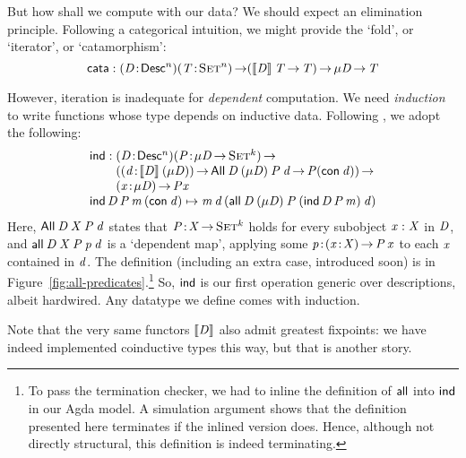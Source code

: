 But how shall we compute with our data?  We should expect an
elimination principle. Following a categorical intuition, we might
provide the `fold', or `iterator', or `catamorphism':
%
\[
\F{cata} : \PITEL{\V{D}}{\Desc^n}
           \PI{\V{T}}{\Set^n}
           (\descop{\V{D}}{\V{T}} \To \V{T}) \To 
           \Mu{\V{D}} \To \V{T} 
\]

\newcommand{\SYMBind}{\F{ind}}

However, iteration is inadequate for \emph{dependent} computation.
We need \emph{induction} to write functions whose type depends on inductive
data. Following \citet{benke:universe-generic-prog}, we adopt the following:
%
\[\stk{
\F{ind} : \stk{ \PITEL{\V{D}}{\Desc^n}
                \PI{\V{P}}{\Mu{\V{D}} \To \Set^k}         \\
               (\PI{\V{d}}{\descop{\V{D}}{(\Mu{\V{D}})}}       
                \All{\V{D}}{(\Mu{\V{D}})}{\V{P}}{\V{d}} \To \V{P} (\Con{\V{d}})) \To \\
               \PI{\V{x}}{\Mu{\V{D}}} \V{P} \V{x} 
} \\
\F{ind}\, \V{D}\, \V{P}\, \V{m}\, (\Con{\V{d}}) \mapsto 
    \V{m}\, \V{d}\, (\all{\V{D}}{(\Mu{\V{D}})}{\V{P}}
                           {(\F{ind}\, \V{D}\, \V{P}\, \V{m})}
                           {\V{d}})
}\]
%
Here, $\All{\V{D}}{\V{X}}{\V{P}}{\V{d}}$ states that
$\Bhab{\V{P}}{\V{X} \To \Set^k}$ holds for every subobject $\V{x}:\V{X}$
in \(\V{D}\), and \(\all{\V{D}}{\V{X}}{\V{P}}{\V{p}}{\V{d}}\) is a
`dependent map', applying some
\(\Bhab{\V{p}}{\PIS{\Bhab{\x}{\V{X}}}\V{P}\,\V{x}}\) to each \(\x\)
contained in \(\V{d}\). The definition (including an extra case,
introduced soon) is in
Figure~\ref{fig:all-predicates}.\footnote{To pass the termination
  checker, we had to inline the definition of $\SYMBall$ into
  $\SYMBind$ in our Agda model. A simulation argument shows that the
  definition presented here terminates if the inlined version
  does. Hence, although not directly structural, this definition is
  indeed terminating.} So, $\SYMBind$ is our first
operation generic over descriptions, albeit hardwired.  Any
datatype we define comes with induction.

Note that the very same functors \(\SYMBdescop{\M{D}}\) also admit greatest
fixpoints: we have indeed implemented coinductive types this way, but
that is another story.

